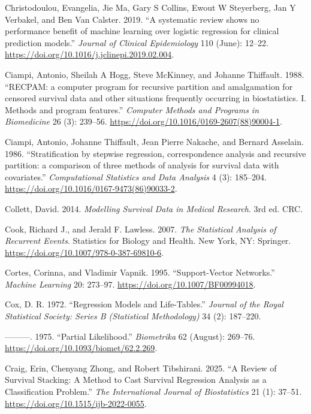 \documentclass[
  letterpaper,
  krantz2]{style/krantz}
\newlength{\cslhangindent}
\newenvironment{CSLReferences}[2] %
 {\begin{list}{}{%
  \setlength{\itemindent}{0pt}
  \setlength{\leftmargin}{0pt}
  \setlength{\parsep}{0pt}
  \ifodd #1
   \setlength{\leftmargin}{\cslhangindent}
   \setlength{\itemindent}{-1\cslhangindent}
  \fi
  \setlength{\itemsep}{#2\baselineskip}}}
 {\end{list}}
\begin{document}
\begin{CSLReferences}{1}{0}
Christodoulou, Evangelia, Jie Ma, Gary S Collins, Ewout W Steyerberg,
Jan Y Verbakel, and Ben Van Calster. 2019. {``{A systematic review shows
no performance benefit of machine learning over logistic regression for
clinical prediction models}.''} \emph{Journal of Clinical Epidemiology}
110 (June): 12--22.
\url{https://doi.org/10.1016/j.jclinepi.2019.02.004}.

Ciampi, Antonio, Sheilah A Hogg, Steve McKinney, and Johanne Thiffault.
1988. {``{RECPAM: a computer program for recursive partition and
amalgamation for censored survival data and other situations frequently
occurring in biostatistics. I. Methods and program features}.''}
\emph{Computer Methods and Programs in Biomedicine} 26 (3): 239--56.
\url{https://doi.org/10.1016/0169-2607(88)90004-1}.

Ciampi, Antonio, Johanne Thiffault, Jean Pierre Nakache, and Bernard
Asselain. 1986. {``{Stratification by stepwise regression,
correspondence analysis and recursive partition: a comparison of three
methods of analysis for survival data with covariates}.''}
\emph{Computational Statistics and Data Analysis} 4 (3): 185--204.
\url{https://doi.org/10.1016/0167-9473(86)90033-2}.

Collett, David. 2014. \emph{{Modelling Survival Data in Medical
Research}}. 3rd ed. CRC.

Cook, Richard J., and Jerald F. Lawless. 2007. \emph{The {Statistical
Analysis} of {Recurrent Events}}. Statistics for {Biology} and {Health}.
New York, NY: Springer. \url{https://doi.org/10.1007/978-0-387-69810-6}.

Cortes, Corinna, and Vladimir Vapnik. 1995. {``Support-Vector
Networks.''} \emph{Machine Learning} 20: 273--97.
\url{https://doi.org/10.1007/BF00994018}.

Cox, D. R. 1972. {``{Regression Models and Life-Tables}.''}
\emph{Journal of the Royal Statistical Society: Series B (Statistical
Methodology)} 34 (2): 187--220.

---------. 1975. {``Partial Likelihood.''} \emph{Biometrika} 62
(August): 269--76. \url{https://doi.org/10.1093/biomet/62.2.269}.

Craig, Erin, Chenyang Zhong, and Robert Tibshirani. 2025. {``A Review of
Survival Stacking: A Method to Cast Survival Regression Analysis as a
Classification Problem.''} \emph{The International Journal of
Biostatistics} 21 (1): 37--51.
\url{https://doi.org/10.1515/ijb-2022-0055}.


\end{CSLReferences}
\end{document}
